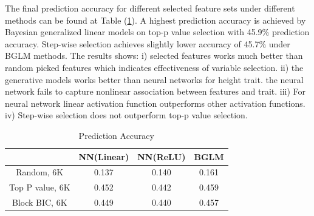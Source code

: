\documentclass[acmtog, authorversion]{acmart}
\begin{document}
The final prediction accuracy for different selected feature sets under different methods can be found at Table (\ref{tab:pred1}). A highest prediction accuracy is achieved by Bayesian generalized linear models on top-p value selection with 45.9\% prediction accuracy. Step-wise selection achieves slightly lower accuracy of 45.7\% under BGLM methods. The results shows: i) selected features works much better than random picked features which indicates effectiveness of variable selection. ii) the generative models works better than neural networks for height trait. the neural network fails to capture nonlinear association between features and trait. iii) For neural network linear activation function outperforms other activation functions. iv) Step-wise selection does not outperform top-p value selection.

\begin{table}[h!]
\centering
\caption{Prediction Accuracy}
\label{tab:pred1}
\begin{tabular}{|c|c|c|c|}
\hline
                & NN(Linear) & NN(ReLU) & BGLM  \\ \hline
Random, 6K      & 0.137      & 0.140    & 0.161 \\ \hline
Top P value, 6K & 0.452      & 0.442    & 0.459 \\ \hline
Block BIC, 6K   & 0.449      & 0.440    & 0.457 \\ \hline
\end{tabular}
\end{table}



\end{document}
